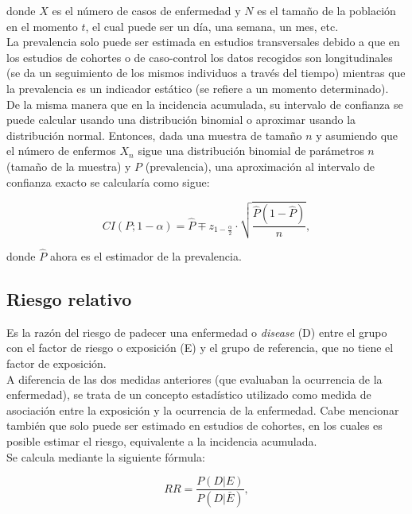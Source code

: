 donde $X$ es el número de casos de enfermedad y $N$ es el tamaño de la población en el momento $t$, el cual puede ser un día, una semana, un mes, etc.\\

La prevalencia solo puede ser estimada en estudios transversales debido a que en los estudios de cohortes o de caso-control los datos recogidos son longitudinales (se da un seguimiento de los mismos individuos a través del tiempo) mientras que la prevalencia es un indicador estático (se refiere a un momento determinado).\\

De la misma manera que en la incidencia acumulada, su intervalo de confianza se puede calcular usando una distribución binomial o aproximar usando la distribución normal. Entonces, dada una muestra de tamaño $n$ y asumiendo que el número de enfermos $X_n$ sigue una distribución binomial de parámetros $n$ (tamaño de la muestra) y $P$ (prevalencia), una aproximación al intervalo de confianza exacto se calcularía como sigue:

\begin{equation*}
CI(P;1-\alpha)=\hat{P} \mp  z_{1-\frac{\alpha}{2}} 	\cdot \sqrt{\frac{\hat{P}(1-\hat{P})}{n}},
\end{equation*}

donde $\hat{P}$ ahora es el estimador de la prevalencia.

\subsection{Riesgo relativo}
Es la razón del riesgo de padecer una enfermedad o \textit{disease} (D) entre el grupo con el factor de riesgo o exposición (E) y el grupo de referencia, que no tiene el factor de exposición.\\

A diferencia de las dos medidas anteriores (que evaluaban la ocurrencia de la enfermedad), se trata de un concepto estadístico utilizado como medida de asociación entre la exposición y la ocurrencia de la enfermedad. Cabe mencionar también que solo puede ser estimado en estudios de cohortes, en los cuales es posible estimar el riesgo, equivalente a la incidencia acumulada.\\

Se calcula mediante la siguiente fórmula:

\begin{equation}
\label{eq:RR}
RR=\frac{P(D|E)}{P(D|\bar{E})},
\end{equation}

